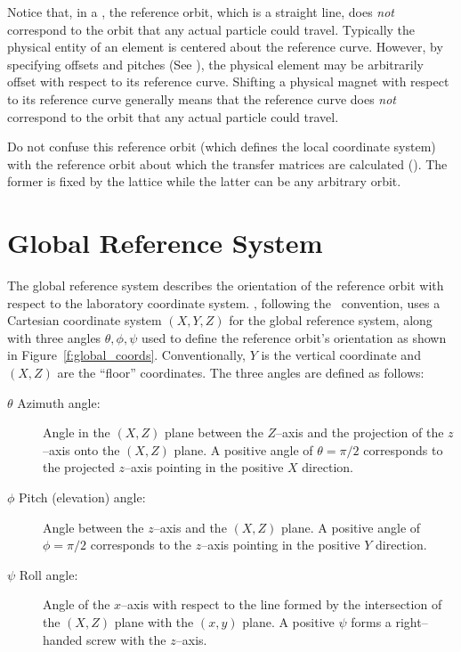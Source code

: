 Notice that, in a , the reference orbit, which is a
straight line, does {\em not} correspond to the orbit that any actual
particle could travel. Typically the physical entity of an element is
centered about the reference curve. However, by specifying offsets and
pitches (See ), the physical element may be
arbitrarily offset with respect to its reference curve.  Shifting a
physical magnet with respect to its reference curve generally means
that the reference curve does {\em not} correspond to the orbit that
any actual particle could travel.

Do not confuse this reference orbit (which defines the local
coordinate system) with the reference orbit about which the transfer
matrices are calculated (). The former is fixed by the
lattice while the latter can be any arbitrary orbit.

\section{Global Reference System}
\label{s:global}

The global reference system describes the orientation of the reference
orbit with respect to the laboratory coordinate system.  \bmad,
following the \mad\ convention, uses a Cartesian coordinate system
$(X, Y, Z)$ for the global reference system, along with three angles
$\theta, \phi, \psi$ used to define the reference orbit's orientation
as shown in Figure~\ref{f:global_coords}. Conventionally, $Y$ is the
vertical coordinate and $(X, Z)$ are the ``floor'' coordinates.  The
three angles are defined as follows:
\begin{description}
\item[$\theta$ Azimuth angle:] Angle in the $(X, Z)$ plane 
between the $Z$--axis and the projection of the $z$--axis onto the
$(X, Z)$ plane. A positive angle of $\theta = \pi/2$ corresponds to the
projected $z$--axis pointing in the positive $X$ direction.
\item[$\phi$ Pitch (elevation) angle:] Angle between the $z$--axis 
and the $(X,Z)$ plane. A positive angle of $\phi = \pi/2$ corresponds to
the $z$--axis pointing in the positive $Y$ direction.
\item[$\psi$ Roll angle:] Angle of the $x$--axis with respect 
to the line formed by the
intersection of the $(X, Z)$ plane with the $(x, y)$ plane. A
positive $\psi$ forms a right--handed screw with the $z$--axis.
\end{description}

